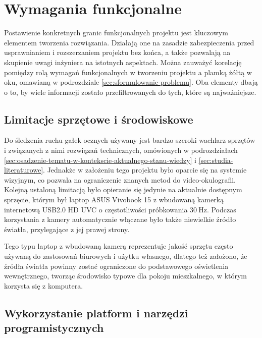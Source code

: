 \documentclass[a4paper,twoside,12pt]{book}
\begin{document}
\section{Wymagania funkcjonalne}
\label{sec:wymagania-funkcjonalne}

Postawienie konkretnych granic funkcjonalnych projektu jest kluczowym elementem tworzenia rozwiązania. Działają one na zasadzie zabezpieczenia przed usprawnianiem i rozszerzaniem projektu bez końca, a także pozwalają na skupienie uwagi inżyniera na istotnych aspektach. Można zauważyć korelację pomiędzy rolą wymagań funkcjonalnych w tworzeniu projektu a plamką żółtą w oku, omawianą w podrozdziale \ref{sec:sformulowanie-problemu}. Oba elementy dbają o to, by wiele informacji zostało przefiltrowanych do tych, które są najważniejsze.

\subsection{Limitacje sprzętowe i środowiskowe}
\label{subsec:Limitacje-sprzetowe-i-srodowiskowe}

Do śledzenia ruchu gałek ocznych używany jest bardzo szeroki wachlarz sprzętów i związanych z nimi rozwiązań technicznych, omówionych w podrozdziałach \ref{sec:osadzenie-tematu-w-kontekscie-aktualnego-stanu-wiedzy} i \ref{sec:studia-literaturowe}. Jednakże w założeniu tego projektu było oparcie się na systemie wizyjnym, co pozwala na ograniczenie znanych metod do video-okulografii. Kolejną ustaloną limitacją było opieranie się jedynie na aktualnie dostępnym sprzęcie, którym był laptop ASUS Vivobook 15 z wbudowaną kamerką internetową USB2.0 HD UVC o częstotliwości próbkowania $30 \ \unit{\hertz}$. Podczas korzystania z kamery automatycznie włączane było także niewielkie źródło światła, przylegające z jej prawej strony.

Tego typu laptop z wbudowaną kamerą reprezentuje jakość sprzętu często używaną do zastosowań biurowych i użytku własnego, dlatego też założono, że źródła światła powinny zostać ograniczone do podstawowego oświetlenia wewnętrznego, tworząc środowisko typowe dla pokoju mieszkalnego, w którym korzysta się z komputera.

\subsection{Wykorzystanie platform i narzędzi programistycznych}
\label{subsec:Wykorzystanie-platform-i-narzedzi-programistycznych}
\end{document}
